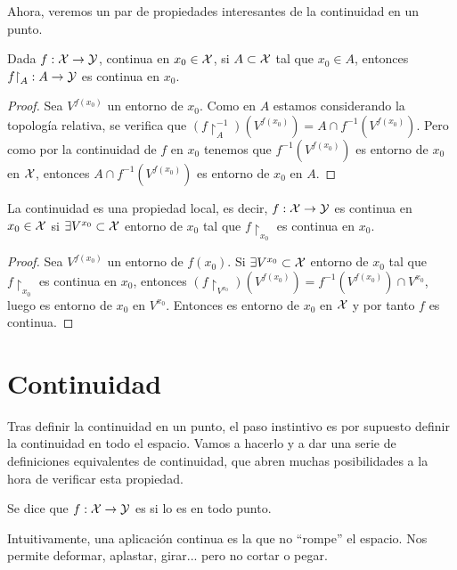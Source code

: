 Ahora, veremos un par de propiedades interesantes de la continuidad en un punto.

\begin{prop}
	Dada $f:\mathcal{X}\to\mathcal{Y}$, continua en $x_0\in\mathcal{X}$, si $A\subset\mathcal{X}$ tal que $x_0\in A$, entonces $f\mathord{\upharpoonright}_A:A\to\mathcal{Y}$ es continua en $x_0$.
	
	\begin{proof}
		Sea $V^{f(x_0)}$ un entorno de $x_0$. Como en $A$ estamos considerando la topología relativa, se verifica que $(f\restriction_A^{-1})(V^{f(x_0)}) = A\cap f^{-1}(V^{f(x_0)})$. Pero como por la continuidad de $f$ en $x_0$ tenemos que $f^{-1}(V^{f(x_0)})$ es entorno de $x_0$ en $\mathcal{X}$, entonces $A\cap f^{-1}(V^{f(x_0)})$ es entorno de $x_0$ en $A$.
	\end{proof}
\end{prop}

\begin{prop}
	La continuidad es una propiedad local, es decir, $f:\mathcal{X}\to\mathcal{Y}$ es continua en $x_0\in\mathcal{X}$ si $\exists V^{x_0}\subset\mathcal{X}$ entorno de $x_0$ tal que $f\restriction_{x_0}$ es continua en $x_0$.
	
	\begin{proof}
		Sea $V^{f(x_0)}$ un entorno de $f(x_0)$. Si $\exists V^{x_0}\subset\mathcal{X}$ entorno de $x_0$ tal que $f\restriction_{x_0}$ es continua en $x_0$, entonces $(f\restriction_{V^{x_0}})(V^{f(x_0)}) = f^{-1}(V^{f(x_0)})\cap V^{x_0}$, luego es entorno de $x_0$ en $V^{x_0}$. Entonces es entorno de $x_0$ en $\mathcal{X}$ y por tanto $f$ es continua.
	\end{proof}
\end{prop}

\section{Continuidad}

Tras definir la continuidad en un punto, el paso instintivo es por supuesto definir la continuidad en todo el espacio. Vamos a hacerlo y a dar una serie de definiciones equivalentes de continuidad, que abren muchas posibilidades a la hora de verificar esta propiedad.

\begin{defi}[Continuidad]
	Se dice que $f:\mathcal{X}\to\mathcal{Y}$ es  si lo es en todo punto.
\end{defi}

Intuitivamente, una aplicación continua es la que no ``rompe'' el espacio. Nos permite deformar, aplastar, girar... pero no cortar o pegar.


